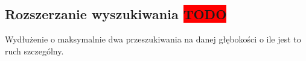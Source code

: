 \subsection{Rozszerzanie wyszukiwania \colorbox{red}{TODO}}
\label{subsec:rozszerzanie-wyszukiwania}

{
    \color{red}
    \large Wydłużenie o maksymalnie dwa przeszukiwania na danej głębokości o ile jest to ruch szczególny.
}